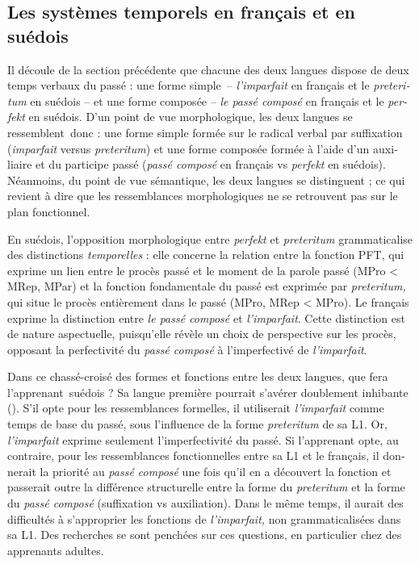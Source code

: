 \documentclass[french, output=paper]{langscibook}
\begin{document}
\begin{otherlanguage}{french}
\subsection{Les systèmes temporels en français et en suédois}\label{sec:kihlstedt:1.2}

Il découle de la section précédente que chacune des deux langues dispose de deux temps verbaux du passé : une forme simple~-- \textit{l’imparfait} en français et le \textit{preteritum} en suédois -- et une forme composée -- \textit{le passé composé} en français et le \textit{perfekt} en suédois. D’un point de vue morphologique, les deux langues se ressemblent~donc : une forme simple formée sur le radical verbal par suffixation (\textit{imparfait} versus \textit{preteritum}) et une forme composée formée à l’aide d’un auxiliaire et du participe passé (\textit{passé composé} en français vs \textit{perfekt} en suédois). Néanmoins, du point de vue sémantique, les deux langues se distinguent ; ce qui revient à dire que les ressemblances morphologiques ne se retrouvent pas sur le plan fonctionnel. 



En suédois, l’opposition morphologique entre \textit{perfekt} et \textit{preteritum} grammaticalise des distinctions \textit{temporelles} : elle concerne la relation entre la fonction PFT, qui exprime un lien entre le procès passé et le moment de la parole passé (MPro < MRep, MPar) et la fonction fondamentale du passé est exprimée par \textit{preteritum,} qui situe le procès entièrement dans le passé (MPro, MRep < MPro). Le français exprime la distinction entre \textit{le passé composé} et \textit{l’imparfait}. Cette distinction est de nature aspectuelle, puisqu'elle révèle un choix de perspective sur les procès, opposant la perfectivité du \textit{passé composé} à l’imperfectivé de \textit{l’imparfait}. 



Dans ce chassé-croisé des formes et fonctions entre les deux langues, que fera l’apprenant~suédois ? Sa langue première pourrait s’avérer doublement inhibante (\citealt[195]{Véronique2009}). S’il opte pour les ressemblances formelles, il utiliserait \textit{l’imparfait} comme temps de base du passé, sous l’influence de la forme \textit{preteritum} de sa L1. Or, \textit{l’imparfait} exprime seulement l’imperfectivité du passé. Si l’apprenant opte, au contraire, pour les ressemblances fonctionnelles entre sa L1 et le français, il donnerait la priorité au \textit{passé composé} une fois qu’il en a découvert la fonction et passerait outre la différence structurelle entre la forme du \textit{preteritum} et la forme du \textit{passé composé} (suffixation vs auxiliation). Dans le même temps, il aurait des difficultés à s’approprier les fonctions de \textit{l’imparfait,} non grammaticalisées dans sa L1. Des recherches se sont penchées sur ces questions, en particulier chez des apprenants adultes.



\end{otherlanguage}
\end{document}
